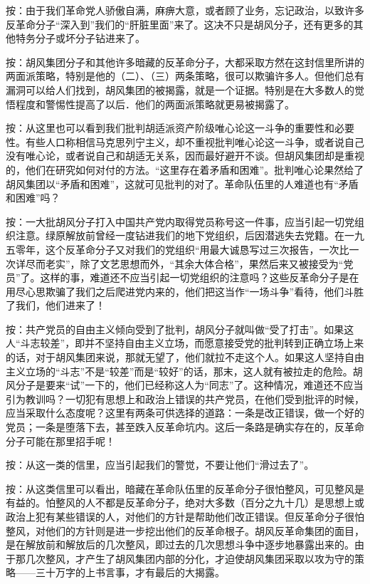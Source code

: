 按：由于我们革命党人骄傲自满，麻痹大意，或者顾了业务，忘记政治，以致许多反革命分子“深入到”我们的“肝脏里面”来了。这决不只是胡风分子，还有更多的其他特务分子或坏分子钻进来了。

按：胡风集团分子和其他许多暗藏的反革命分子，大都采取方然在这封信里所讲的两面派策略，特别是他的（二）、（三）两条策略，很可以欺骗许多人。但他们总有漏洞可以给人们找到，胡风集团的被揭露，就是一个证据。特别是在大多数人的觉悟程度和警惕性提高了以后．他们的两面派策略就更易被揭露了。

按：从这里也可以看到我们批判胡适派资产阶级唯心论这一斗争的重要性和必要性。有些人口称相信马克思列宁主义，却不重视批判唯心论这一斗争，或者说自己没有唯心论，或者说自己和胡适无关系，因而最好避开不谈。但胡风集团却是重视的，他们在研究如何对付的方法。“这里存在着矛盾和困难”。批判唯心论果然给了胡风集团以“矛盾和困难”，这就可见批判的对了。革命队伍里的人难道也有“矛盾和困难”吗？

按：一大批胡风分子打入中国共产党内取得党员称号这一件事，应当引起一切党组织注意。绿原解放前曾经一度钻进我们的地下党组织，后因潜逃失去党籍。在一九五零年，这个反革命分子又对我们的党组织“用最大诚恳写过三次报告，一次比一次详尽而老实”，除了文艺思想而外，“其余大体合格”，果然后来又被接受为“党员”了。这样的事，难道还不应当引起一切党组织的注意吗？这些反革命分子是在用尽心思欺骗了我们之后爬进党内来的，他们把这当作“一场斗争”看待，他们斗胜了我们，他们进来了！

按：共产党员的自由主义倾向受到了批判，胡风分子就叫做“受了打击”。如果这人“斗志较差”，即并不坚持自由主义立场，而愿意接受党的批判转到正确立场上来的话，对于胡风集团来说，那就无望了，他们就拉不走这个人。如果这人坚持自由主义立场的“斗志”不是“较差”而是“较好”的话，那末，这人就有被拉走的危险。胡风分子是要来“试”一下的，他们已经称这人为“同志”了。这种情况，难道还不应当引为教训吗？一切犯有思想上和政治上错误的共产党员，在他们受到批评的时候，应当采取什么态度呢？这里有两条可供选择的道路：一条是改正错误，做一个好的党员；一条是堕落下去，甚至跌入反革命坑内。这后一条路是确实存在的，反革命分子可能在那里招手呢！

按：从这一类的信里，应当引起我们的警觉，不要让他们“滑过去了”。

按：从这类信里可以看出，暗藏在革命队伍里的反革命分子很怕整风，可见整风是有益的。怕整风的人不都是反革命分子，绝对大多数（百分之九十几）是思想上或政治上犯有某些错误的人，对他们的方针是帮助他们改正错误。但反革命分子很怕整风，对他们的方针则是进一步挖出他们的反革命根子。胡风反革命集团的面目，是在解放前和解放后的几次整风，即过去的几次思想斗争中逐步地暴露出来的。由于那几次整风，才产生了胡风集团内部的分化，才迫使胡风集团采取以攻为守的策略——三十万字的上书言事，才有最后的大揭露。

